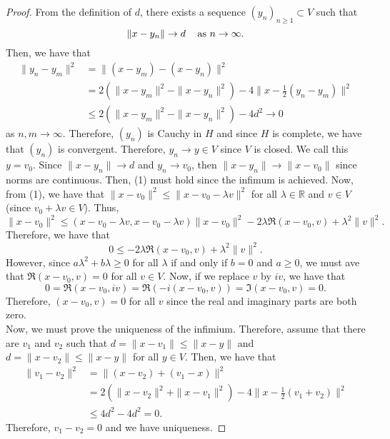 \documentclass[12pt]{article}
\newcommand{\R}{{\mathbb R}}
\newcommand{\sbs}{\subset}
\begin{document}
\begin{proof}
From the definition of $d$, there exists a sequence $(y_n)_{n \geq 1} \sbs V$ such that 
\begin{equation}
\| x - y_n \| \to d \hspace{3mm} \text{ as  } n \to \infty. 
\end{equation}
Then, we have that 
\begin{align*}
\| y_n - y_m \|^2 & = \| (x - y_m) - (x - y_n) \|^2 \\
& = 2 \left( \| x - y_m \|^2 - \| x - y_n \|^2 \right) - 4 \| x - \frac{1}{2} (y_n - y_m) \|^2 \\
& \leq 2 \left( \| x - y_m \|^2 - \| x - y_n \|^2  \right) - 4d^2 \to 0 
\end{align*}
as $n, m \to \infty$. Therefore, $(y_n)$ is Cauchy in $H$ and since $H$ is complete, we have that $(y_n)$ is convergent. Therefore, $y_n \to y \in V$ since $V$ is closed. We call this $y = v_0$. Since $\| x - y_n \| \to d$ and $y_n \to v_0$, then $\| x - y_n \| \to \| x - v_0 \|$ since norms are continuous. Then, (1) must hold since the infimum is achieved. Now, from (1), we have that $\| x - v_0\|^2 \leq \| x - v_0 - \lambda v \|^2$ for all $\lambda \in \R$ and $v \in V$ (since $v_0 + \lambda v \in V$). Thus, 
\[ \| x - v_0 \|^2 \leq (x - v_0 - \lambda v, x - v_0 -\lambda v)  \| x - v_0\|^2 - 2 \lambda \Re(x - v_0, v) + \lambda^2 \| v\|^2.\]
Therefore, we have that 
\[ 0 \leq -2 \lambda \Re(x - v_0, v) + \lambda^2 \| v \|^2.\]
However, since $a\lambda^2 + b \lambda \geq 0$ for all $\lambda$ if and only if $b = 0$ and $a \geq 0$, we must ave that $\Re(x - v_0, v) = 0$ for all $v \in V$. Now, if we replace $v$ by $iv$, we have that 
\[ 0 = \Re(x - v_0, iv) = \Re(-i(x - v_0, v)) = \Im(x - v_0, v) = 0.\]
Therefore, $(x - v_0, v) = 0$ for all $v$ since the real and imaginary parts are both zero. \\
\indent Now, we must prove the uniqueness of the infimium. Therefore, assume that there are $v_1$ and $v_2$ such that $d = \| x - v_1 \| \leq \| x - y \|$ and $d = \| x - v_2 \| \leq \| x - y \|$ for all $y \in V$. Then, we have that 
\begin{align*}
\| v_1  - v_2 \|^2 & = \| (x - v_2) + (v_1 - x) \|^2  \\
& = 2 \left( \| x - v_2 \|^2 + \| x - v_1 \|^2 \right) - 4 \| x - \frac{1}{2} (v_1  +v_2 ) \|^2 \\
& \leq 4d^2 - 4d^2 = 0.
\end{align*} 
Therefore, $v_1 -v_2 = 0$ and we have uniqueness. 
\end{proof}
\end{document}
